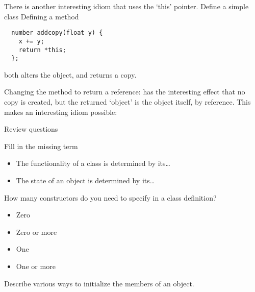 There is another interesting idiom that uses the `this' pointer.
Define a simple class
%
%
Defining a method
\begin{lstlisting}
  number addcopy(float y) {
    x += y;
    return *this;
  };
\end{lstlisting}
both alters the object, and returns a copy.

Changing the method to return a reference:
%
%
has the interesting effect that no copy is created,
but the returned `object' is the object itself,
by reference.
This makes an interesting idiom possible:
%

 {Review questions}

\begin{review}
  \label{ex:class-review1}
  Fill in the missing term
  \begin{itemize}
  \item The functionality of a class is determined by its\ldots
  \item The state of an object is determined by its\ldots
  \end{itemize}

  How many constructors do you need to specify in a class definition?
  \begin{itemize}
  \item Zero
  \item Zero or more
  \item One
  \item One or more
  \end{itemize}
\end{review}

\begin{review}
  \label{ex:class-review2}
  Describe various ways to initialize the members of an object.
\end{review}

\ifIncludeAnswers
\else
\endinput
\fi

\Level 0 {Homework discussions}

\Level 1 {Square inheritance}
\label{sec:discuss-square}

\begin{multicols}{2}
  \scriptsize
  \lstset{basicstyle=scriptsize}
  
  \lstset{basicstyle=footnotesize}
\end{multicols}

\Level 1 {Goldbach conjecture}
\label{sec:discuss-goldbach}

\begin{multicols}{2}
  \scriptsize
  \lstset{basicstyle=scriptsize}
  
  \lstset{basicstyle=footnotesize}
\end{multicols}

